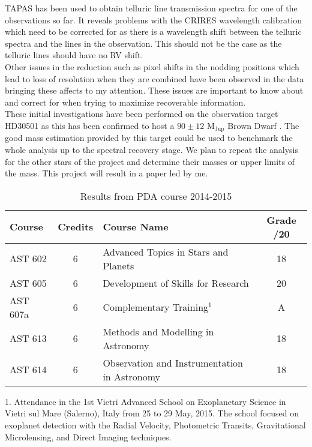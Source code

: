 \documentclass[pdftex,12pt,a4paper]{article}
\begin{document}
TAPAS has been used to obtain telluric line transmission spectra for one of the observations so far. It reveals problems with the CRIRES wavelength calibration which need to be corrected for as there is a wavelength shift between the telluric spectra and the lines in the observation. This should not be the case as the telluric lines should have no RV shift.\\
 
Other issues in the reduction such as pixel shifts in the nodding positions which lead to loss of resolution when they are combined have been observed in the data bringing these affects to my attention. These issues are important to know about and correct for when trying to maximize recoverable information. \\

These initial investigations have been performed on the observation target HD30501 as this has been confirmed to host a $90\pm12$ M$_{\textrm{Jup}}$ Brown Dwarf \citep{Sahlmann2011}. The good mass estimation provided by this target could be used to benchmark the whole analysis up to the spectral recovery stage. We plan to repeat the analysis for the other stars of the project and determine their masses or upper limits of the mass. This project will result in a paper led by me. \\

\begin{table}[h]
	\centering
 
	\begin{threeparttable}
		\caption{Results from PDA course 2014-2015}
		\begin{tabular}{ l c l c}
			\hline
			Course 	& Credits & Course Name & Grade /20\\
			\hline
			AST 602	& 6 & Advanced Topics in Stars and Planets & 18 \\
			AST 605 & 6 & Development of Skills for Research & 20 \\
			AST 607a & 6 & Complementary Training$^1$ & A \\
			AST 613 & 6 & Methods and Modelling in Astronomy & 18\\
			AST 614 & 6 & Observation and Instrumentation in Astronomy & 18\\
			\hline
		\end{tabular}
		\begin{tablenotes}
			\small
			\item 1. Attendance in the 1st Vietri Advanced School on Exoplanetary Science in Vietri sul Mare (Salerno), Italy from 25 to 29 May, 2015. The school focused on exoplanet detection with the Radial Velocity, Photometric Transits, Gravitational Microlensing, and Direct Imaging techniques.
		\end{tablenotes}
 \label{Courses_tab}
	\end{threeparttable}

\end{table}
\end{document}
